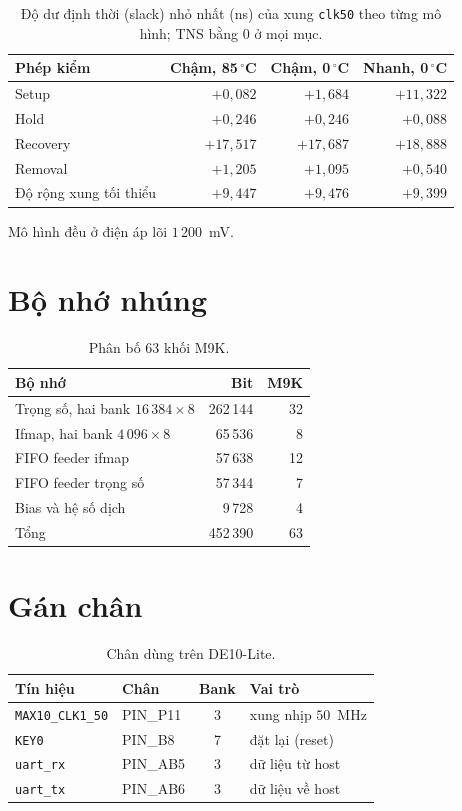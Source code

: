 \begin{table}[H]\centering
\caption{Độ dư định thời (slack) nhỏ nhất (ns) của xung \texttt{clk50} theo từng mô hình; TNS bằng $0$ ở mọi mục.}\label{tab:pl-sta}
\small\setlength{\tabcolsep}{6pt}
\begin{tabular}{@{}lrrr@{}}
\toprule
Phép kiểm & Chậm, 85\,$^\circ$C & Chậm, 0\,$^\circ$C & Nhanh, 0\,$^\circ$C \\ \midrule
Setup & $+0{,}082$ & $+1{,}684$ & $+11{,}322$ \\
Hold & $+0{,}246$ & $+0{,}246$ & $+0{,}088$ \\
Recovery & $+17{,}517$ & $+17{,}687$ & $+18{,}888$ \\
Removal & $+1{,}205$ & $+1{,}095$ & $+0{,}540$ \\
Độ rộng xung tối thiểu & $+9{,}447$ & $+9{,}476$ & $+9{,}399$ \\ \bottomrule
\end{tabular}

\smallskip
\footnotesize Mô hình đều ở điện áp lõi $1\,200$~mV.
\end{table}

\section*{Bộ nhớ nhúng}
\begin{table}[H]\centering
\caption{Phân bố $63$ khối M9K.}\label{tab:pl-m9k}
\small\setlength{\tabcolsep}{5pt}
\begin{tabular}{@{}lrr@{}}
\toprule
Bộ nhớ & Bit & M9K \\ \midrule
Trọng số, hai bank $16\,384\times8$ & 262\,144 & 32 \\
Ifmap, hai bank $4\,096\times8$ & 65\,536 & 8 \\
FIFO feeder ifmap & 57\,638 & 12 \\
FIFO feeder trọng số & 57\,344 & 7 \\
Bias và hệ số dịch & 9\,728 & 4 \\ \midrule
Tổng & 452\,390 & 63 \\ \bottomrule
\end{tabular}
\end{table}

\section*{Gán chân}
\begin{table}[H]\centering
\caption{Chân dùng trên DE10-Lite.}\label{tab:pl-chan}
\small
\begin{tabular}{@{}llcl@{}}
\toprule
Tín hiệu & Chân & Bank & Vai trò \\ \midrule
\texttt{MAX10\_CLK1\_50} & PIN\_P11 & 3 & xung nhịp $50$~MHz \\
\texttt{KEY0} & PIN\_B8 & 7 & đặt lại (reset) \\
\texttt{uart\_rx} & PIN\_AB5 & 3 & dữ liệu từ host \\
\texttt{uart\_tx} & PIN\_AB6 & 3 & dữ liệu về host \\ \bottomrule
\end{tabular}
\end{table}

